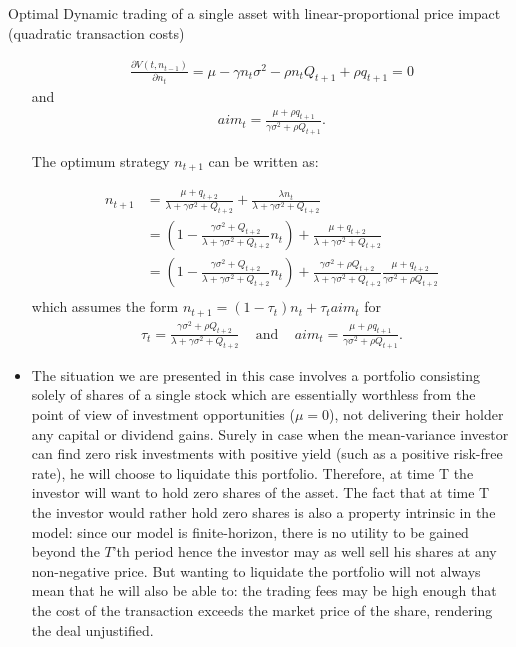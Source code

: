 \documentclass[10pt]{article}
\newenvironment{exercise}[2][Exercise]{\begin{trivlist}
  \item[\hskip \labelsep {\bfseries #1}\hskip \labelsep {\bfseries #2.}]}{\end{trivlist}}
\begin{document}
\begin{exercise}{3}{Optimal Dynamic trading of a single asset with linear-proportional price impact (quadratic transaction costs)}
\begin{itemize}
      \begin{align*}
      \frac{\partial V(t,n_{t-1})}{\partial n_t} = \mu - \gamma n_t \sigma^2 - \rho n_t Q_{t+1} + \rho q_{t+1} = 0
      \end{align*}
      and
      \begin{align*}
        aim_t = \frac{\mu + \rho q_{t+1}}{\gamma\sigma^2 + \rho Q_{t+1}}.
      \end{align*}

      The optimum strategy $n_{t+1}$ can be written as:

      \begin{align*}
        n_{t+1} &= \frac{\mu + q_{t+2}}{\lambda + \gamma \sigma^2 + Q_{t+2}} + \frac{\lambda n_t}{\lambda + \gamma\sigma^2 + Q_{t+2}} \\
        &= \left(1 - \frac{\gamma\sigma^2 + Q_{t+2}}{\lambda + \gamma\sigma^2 + Q_{t+2}} n_t \right) + \frac{\mu + q_{t+2}}{\lambda + \gamma \sigma^2 + Q_{t+2}} \\
        &= \left(1 - \frac{\gamma\sigma^2 + Q_{t+2}}{\lambda + \gamma\sigma^2 + Q_{t+2}} n_t \right) + \frac{\gamma\sigma^2 + \rho Q_{t+2}}{\lambda + \gamma \sigma^2 + Q_{t+2}}\frac{\mu + q_{t+2}}{\gamma\sigma^2 + \rho Q_{t+2}}  \\
      \end{align*}
      which assumes the form $n_{t+1} = (1 - \tau_t) n_t + \tau_t aim_t$ for
      \begin{align*}
        \tau_t = \frac{\gamma\sigma^2 + \rho Q_{t+2}}{\lambda + \gamma \sigma^2 + Q_{t+2}} \;\;\;  \text{ and } \;\;\;
        aim_t = \frac{\mu + \rho q_{t+1}}{\gamma\sigma^2 + \rho Q_{t+1}}.
      \end{align*}

      \item
        The situation we are presented in this case involves a portfolio
        consisting solely of shares of a single stock which are essentially
        worthless from the point of view of investment opportunities ($\mu =
        0$), not delivering their holder any capital or dividend gains. Surely
        in case when the mean-variance investor can find zero risk investments
        with positive yield (such as a positive risk-free rate), he will choose
        to liquidate this portfolio. Therefore, at time T the investor will want
        to hold zero shares of the asset.
        The fact that at time T the investor would rather hold zero shares is
        also a property intrinsic in the model: since our model is
        finite-horizon, there is no utility to be gained beyond the $T$'th
        period hence the investor may as well sell his shares at any
        non-negative price. But wanting to liquidate the portfolio will not
        always mean that he will also be able to: the trading fees may be high
        enough that the cost of the transaction exceeds the market price of the
        share, rendering the deal unjustified.


\end{itemize}
\end{exercise}
\end{document}
